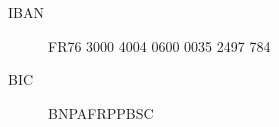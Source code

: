 

\begin{description}
\item[IBAN] FR76 3000 4004 0600 0035 2497 784
\item[BIC] BNPAFRPPBSC
\end{description}
